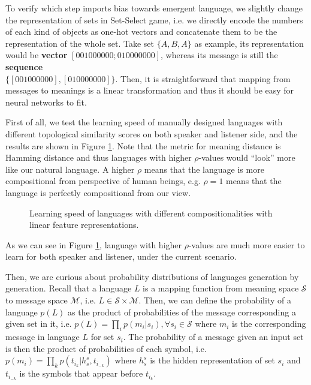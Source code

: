 To verify which step imports bias towards emergent language, we slightly change the representation of sets in Set-Select game, i.e. we directly encode the numbers of each kind of objects as one-hot vectors and concatenate them to be the representation of the whole set. Take set $\{A, B, A\}$ as example, its representation would be \textbf{vector} $[0 0 1 0 0 0 0 0 0; 0 1 0 0 0 0 0 0 0]$, whereas its message is still the \textbf{sequence} \\ $\{[0 0 1 0 0 0 0 0 0], [0 1 0 0 0 0 0 0 0]\}$. Then, it is straightforward that mapping from messages to meanings is a linear transformation and thus it should be easy for neural networks to fit. 

First of all, we test the learning speed of manually designed languages with different topological similarity scores on both speaker and listener side, and the results are shown in Figure \ref{fig4.5:learning_speed_joshua}. Note that the metric for meaning distance is Hamming distance and thus languages with higher $\rho$-values would ``look'' more like our natural language. A higher $\rho$ means that the language is more compositional from perspective of human beings, e.g. $\rho=1$ means that the language is perfectly compositional from our view.

\begin{figure}[!h]
    \centering
    \caption{Learning speed of languages with different compositionalities with linear feature representations.}
    \label{fig4.5:learning_speed_joshua}
\end{figure}

As we can see in Figure \ref{fig4.5:learning_speed_joshua}, language with higher $\rho$-values are much more easier to learn for both speaker and listener, under the current scenario.  

Then, we are curious about probability distributions of languages generation by generation. Recall that a language $L$ is a mapping function from meaning space $\mathcal{S}$ to message space $\mathcal{M}$, i.e. $L\in \mathcal{S} \times \mathcal{M}$. Then, we can define the probability of a language $p(L)$ as the product of probabilities of the message corresponding a given set in it, i.e. $p(L)=\prod_{i} p(m_i|s_i), \forall s_i\in \mathcal{S}$ where $m_i$ is the corresponding message in language $L$ for set $s_i$. The probability of a message given an input set is then the product of probabilities of each symbol, i.e. $p(m_i) = \prod_k p(t_{i_k}|h_s^s, t_{i_{-k}})$ where $h_s^s$ is the hidden representation of set $s_i$ and $t_{i_{-k}}$ is the symbols that appear before $t_{i_k}$.

